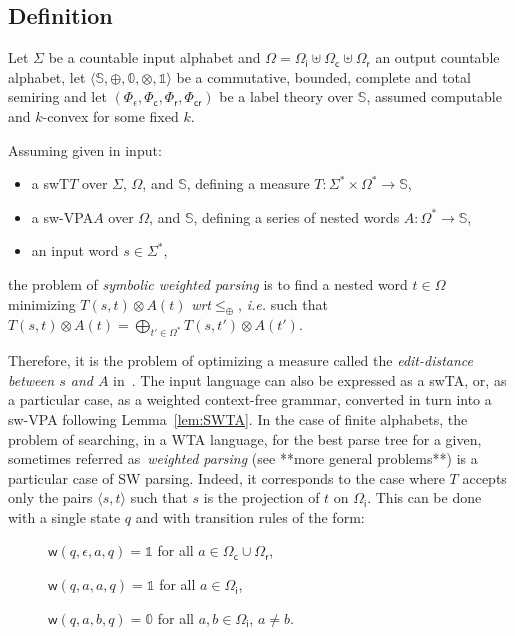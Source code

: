 \documentclass[runningheads]{llncs}
\def\ie{\textit{i.e.}\xspace}
\def\wrt{\textit{wrt}\xspace}
\def\<#1>{\langle #1 \rangle}
\newcommand{\Semiring}{\mathbb{S}}
\newcommand{\zero}{\mathbb{0}}
\newcommand{\one}{\mathbb{1}}
\def\SWT{\textsf{swT}\xspace}
\def\SWTA{\textsf{swTA}\xspace}
\def\SWVPA{\textsf{sw-VPA}\xspace}
\def\wei{\mathsf{w}}
\def\Omegai{{\Omega_\mathsf{i}}}
\def\Omegac{{\Omega_\mathsf{c}}}
\def\Omegar{{\Omega_\mathsf{r}}}
\def\Phic{{\Phi_\mathsf{c}}}
\def\Phir{{\Phi_\mathsf{r}}}
\def\Phicr{{\Phi_\mathsf{cr}}}
\begin{document}
\subsection{Definition}

Let $\Sigma$ be a countable input alphabet 
and $\Omega = \Omegai \uplus \Omegac \uplus \Omegar$ an output countable alphabet,
let $\< \Semiring, \oplus, \zero, \otimes, \one>$ be a commutative, bounded, complete 
and total semiring 
and let  $(\Phi_\epsilon, \Phic, \Phir, \Phicr)$ be a label theory over $\Semiring$, 
assumed computable and $k$-convex for some fixed $k$.

\noindent
Assuming given in input:
\begin{itemize}
\item a \SWT $T$ over $\Sigma$,  $\Omega$, and $\Semiring$,
defining a measure %
$T: \Sigma^* \times \Omega^* \to \Semiring$,
\item a \SWVPA $A$ over $\Omega$, and $\Semiring$, defining a series of nested words
      $A : \Omega^* \to \Semiring$,
\item an input word $s \in \Sigma^*$,
\end{itemize}
the problem of \emph{symbolic weighted parsing} is to find 
a nested word $t \in \Omega$ minimizing
\( T(s, t) \otimes A(t)\)
\wrt $\leq_\oplus$, 
\ie such that %
\( T(s, t) \otimes A(t) = 
  \displaystyle\bigoplus_{t' \in \Omega^*} T(s, t') \otimes A(t') \).

\noindent 
Therefore, it is the problem of optimizing a measure 
called the \emph{edit-distance between $s$ and $A$} in~\cite{Mohri03EDWA}.
%
The input language can also be expressed as a \SWTA, or, 
as a particular case, as a weighted context-free grammar, 
converted in turn into a \SWVPA following Lemma~\ref{lem:SWTA}.
%
In the case of finite alphabets, 
the problem of searching, in a WTA language, 
for the best parse tree for a given,  
sometimes referred as~\emph{weighted parsing}
(see \cite{Goodman99SemiringParsing,MorbitzVogler19weighted-parsing} **more general problems**)
is a particular case of SW parsing.
%
Indeed, it corresponds to the case where $T$
accepts only the pairs $\<s, t>$ such that 
$s$ is the projection of $t$ on $\Omegai$. 
This can be done with a single state $q$ and 
with transition rules of the form:
\begin{description}
\item[] $\wei(q, \epsilon, a, q) = \one$ for all $a \in \Omegac \cup \Omegar$,
\item[] $\wei(q, a, a, q) = \one$ for all $a \in \Omegai$,
\item[] $\wei(q, a, b, q) = \zero$ for all $a, b \in \Omegai$, $a \neq b$.
\end{description}
\end{document}
